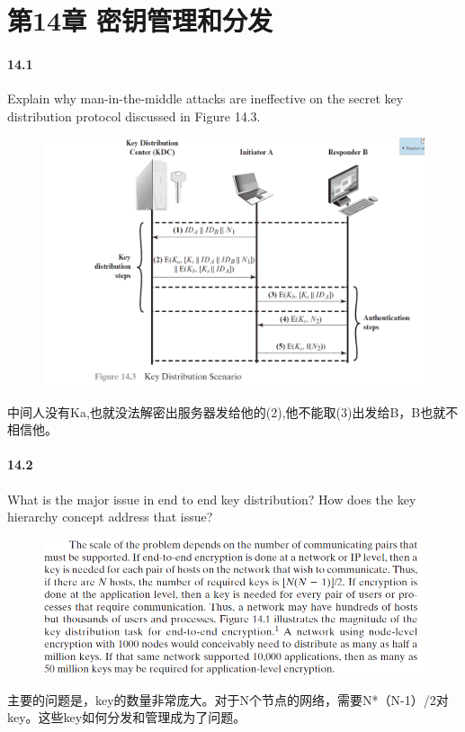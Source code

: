 \documentclass[UTF8]{article}
\begin{document}
\section{第14章 密钥管理和分发}
\paragraph{14.1}
Explain why man-in-the-middle attacks are ineffective on the secret key distribution protocol discussed in Figure 14.3.
\begin{figure}[htbp]
	\centering
	\includegraphics[width=1\textwidth]{img/141.png}
\end{figure}
中间人没有Ka,也就没法解密出服务器发给他的(2),他不能取(3)出发给B，B也就不相信他。
\paragraph{14.2}
What is the major issue in end to end key distribution? How does the key hierarchy concept address that issue?

\begin{figure}[htbp]
	\centering
	\includegraphics[width=1\textwidth]{img/142.png}
\end{figure}
主要的问题是，key的数量非常庞大。对于N个节点的网络，需要N*（N-1）/2对key。这些key如何分发和管理成为了问题。
\end{document}
